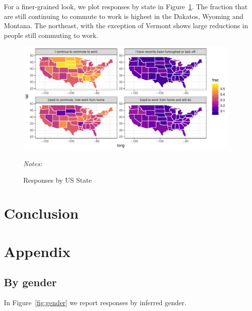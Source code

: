 \documentclass[12pt]{article}
\begin{document}
For a finer-grained look, we plot responses by state in Figure~\ref{fig:geo}. 
The fraction that are still continuing to commute to work is highest in the Dakatos, Wyoming and Montana.
The northeast, with the exception of Vermont shows large reductions in people still commuting to work. 

\begin{figure}
  \caption{Responses by US State} \label{fig:geo}
\centering
\begin{minipage}{1.0 \linewidth}
  \includegraphics[width = \linewidth]{plots/geo.pdf} \\
  \begin{footnotesize}
    \begin{singlespace}
      \emph{Notes:} 
    \end{singlespace}
    \end{footnotesize}
\end{minipage}
\end{figure} 

\section{Conclusion}

\newpage \clearpage




\appendix

\section{Appendix} 
\subsection{By gender} \label{sec:gender}

In Figure~\ref{fig:gender} we report responses by inferred gender.
\end{document}
